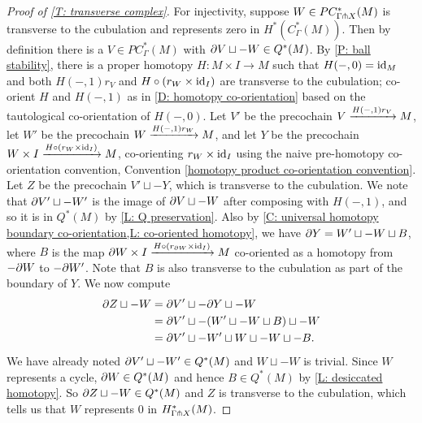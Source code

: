 \begin{proof}[Proof of \cref{T: transverse complex}]
	For injectivity, suppose $W \in PC^*_{\Gamma \pitchfork X}(M)$ is transverse to the cubulation and represents zero in $H^*(C_\Gamma^*(M))$.
	Then by definition there is a $V \in PC^*_\Gamma(M)$ with $\partial V \sqcup -W \in Q^*(M)$.
	By \cref{P: ball stability}, there is a proper homotopy $H \colon M \times I \to M$ such that $H(-,0) = \mathrm{id}_M$ and both $H(-,1)r_V$ and $H\circ (r_W \times \mathrm{id}_I)$ are transverse to the cubulation; co-orient $H$ and $H(-,1)$ as in \cref{D: homotopy co-orientation} based on the tautological co-orientation of $H(-,0)$.
	Let $V'$ be the precochain $V \xrightarrow{H(-,1)r_V} M$, let $W'$ be the precochain $W \xrightarrow{H(-,1)r_W} M$, and let $Y$ be the precochain $W \times I \xrightarrow{H\circ (r_W \times \mathrm{id}_I)} M$, co-orienting $r_W \times \mathrm{id}_I$ using the naive pre-homotopy co-orientation convention, Convention \ref{homotopy product co-orientation convention}.
	Let $Z$ be the precochain $V' \sqcup -Y$, which is transverse to the cubulation.
	We note that $\partial V' \sqcup -W'$ is the image of $\partial V \sqcup -W$ after composing with $H(-,1)$, and so it is in $Q^*(M)$ by \cref{L: Q preservation}.
	Also by \cref{C: universal homotopy boundary co-orientation,L: co-oriented homotopy}, we have $\partial Y = W' \sqcup -W \sqcup B$, where $B$ is the map $\partial W \times I \xrightarrow{H\circ (r_{\partial W} \times \mathrm{id}_I)} M$ co-oriented as a homotopy from $-\partial W$ to $-\partial W'$.
	Note that $B$ is also transverse to the cubulation as part of the boundary of $Y$.
	We now compute
	\begin{align*}
		\partial Z \sqcup -W &= \partial V' \sqcup -\partial Y \sqcup -W\\
		&= \partial V' \sqcup -(W' \sqcup -W \sqcup B) \sqcup -W\\
		&= \partial V' \sqcup -W' \sqcup W \sqcup -W \sqcup -B.
	\end{align*}
	We have already noted $\partial V' \sqcup -W' \in Q^*(M)$ and $W \sqcup -W$ is trivial.
	Since $W$ represents a cycle, $\partial W \in Q^*(M)$ and hence $B \in Q^*(M)$ by \cref{L: desiccated homotopy}.
	So $\partial Z \sqcup -W \in Q^*(M)$ and $Z$ is transverse to the cubulation, which tells us that $W$ represents $0$ in $H^*_{\Gamma \pitchfork X}(M)$.
\end{proof}

